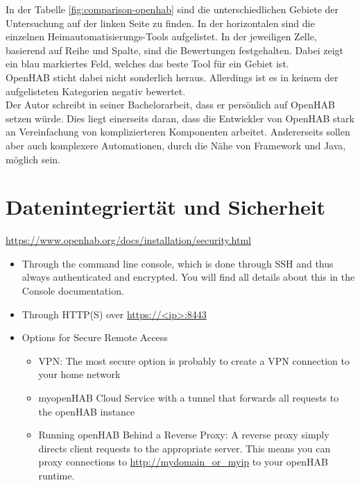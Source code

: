 In der Tabelle \ref{fig:comparison-openhab} sind die unterschiedlichen Gebiete der Untersuchung auf der linken Seite zu finden. In der horizontalen sind die einzelnen Heimautomatisierungs-Tools aufgelistet. In der jeweiligen Zelle, basierend auf Reihe und Spalte, sind die Bewertungen festgehalten. Dabei zeigt ein blau markiertes Feld, welches das beste Tool für ein Gebiet ist.\\
OpenHAB sticht dabei nicht sonderlich heraus. Allerdings ist es in keinem der aufgelisteten Kategorien negativ bewertet.\\
Der Autor schreibt in seiner Bachelorarbeit, dass er persönlich auf OpenHAB setzen würde. Dies liegt einerseits daran, dass die Entwickler von OpenHAB stark an Vereinfachung von komplizierteren Komponenten arbeitet. Andererseits sollen aber auch komplexere Automationen, durch die Nähe von Framework und Java, möglich sein.\cite{BA01:OPH}


\section{Datenintegriertät und Sicherheit}
\url{https://www.openhab.org/docs/installation/security.html}
\begin{itemize}
	\item Through the command line console, which is done through SSH and thus always authenticated and encrypted. You will find all details about this in the Console documentation.
	\item Through HTTP(S) over \url{https://<ip>:8443}
	\item Options for Secure Remote Access
	\begin{itemize}
		\item VPN: The most secure option is probably to create a VPN connection to your home network
		\item myopenHAB Cloud Service with a tunnel that forwards all requests to the openHAB instance
		\item Running openHAB Behind a Reverse Proxy: A reverse proxy simply directs client requests to the appropriate server. This means you can proxy connections to \url{http://mydomain_or_myip} to your openHAB runtime.
	\end{itemize}
\end{itemize}



